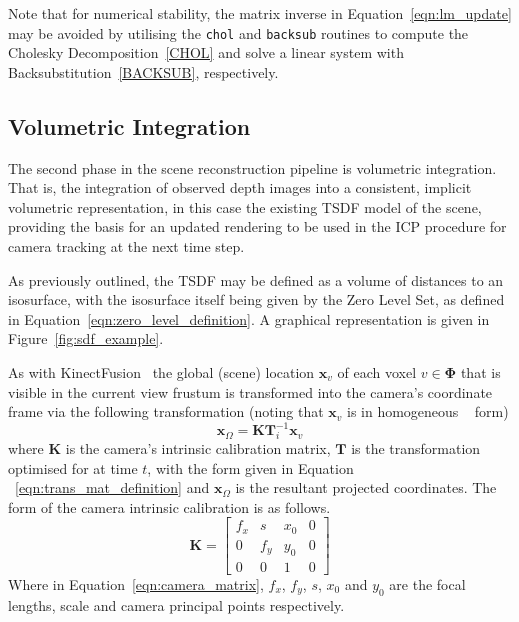 Note that for numerical stability, the matrix inverse in Equation~\ref{eqn:lm_update} 
may be avoided by utilising the \texttt{chol} and \texttt{backsub} routines to 
compute the Cholesky Decomposition~\ref{CHOL} and solve a linear system with 
Backsubstitution~\ref{BACKSUB}, respectively.

\subsection{Volumetric Integration}
\label{subsec:moseg_static_integration}
The second phase in the scene reconstruction pipeline is volumetric integration.
That is, the integration of observed depth images into a consistent, implicit
volumetric representation, in this case the existing TSDF model of the scene,
providing the basis for an updated rendering to be used in the ICP procedure
for camera tracking at the next time step.

As previously outlined, the TSDF may be defined as a volume of distances to an
isosurface, with the isosurface itself being given by the Zero Level Set, as
defined in Equation~\ref{eqn:zero_level_definition}. A graphical representation
is given in Figure~\ref{fig:sdf_example}.

As with KinectFusion~\cite{Newcombe2011} the global (scene) location
\(\bm{x}_{v}\) of each voxel \(v \in \bm{\Phi}\) that is visible in the
current view frustum is transformed into the camera's coordinate frame via the
following transformation (noting that \(\bm{x}_{v}\) is in homogeneous 
~\cite{HOMOGENEOUS} form)
\begin{equation}
\label{eqn:project_tsdf_to_image}
\bm{x}_{\Omega} = \bm{K}\bm{T}_i^{-1}\bm{x}_{v}
\end{equation}
where \(\bm{K}\) is the camera's intrinsic calibration matrix, \(\bm{T}\) is
the transformation optimised for at time \(t\), with the form given in Equation
~\ref{eqn:trans_mat_definition} and \(\bm{x}_{\Omega}\) is the resultant
projected coordinates. The form of the camera intrinsic calibration is as 
follows.
\begin{equation}
  \label{eqn:camera_matrix}
  \bm{K} = 
  \begin{bmatrix}
    f_{x} & s & x_{0} & 0\\
    0 & f_{y} & y_{0} & 0\\
    0 & 0 & 1 & 0
  \end{bmatrix}
\end{equation}
Where in Equation~\ref{eqn:camera_matrix}, \(f_{x}\), \(f_{y}\), \(s\), \(x_{0}\) 
and \(y_{0}\) are the focal lengths, scale and camera principal points respectively.

